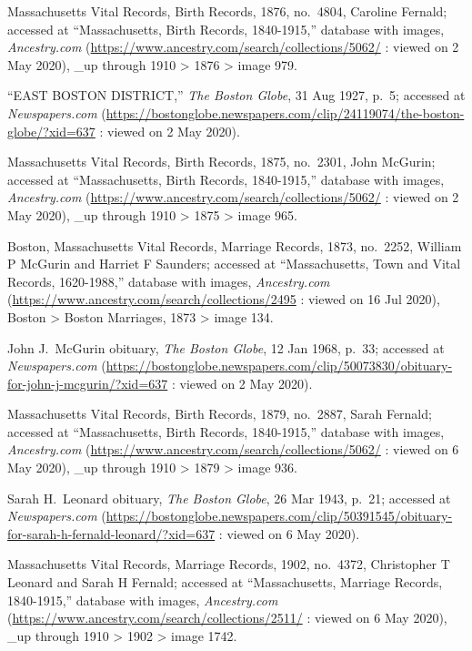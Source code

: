 \begin{thebibliography}{999}

Massachusetts Vital Records, Birth Records, 1876, no.\ 4804, Caroline Fernald; accessed at ``Massachusetts, Birth Records, 1840-1915,'' database with images, \textit{Ancestry.com} (\url{https://www.ancestry.com/search/collections/5062/} : viewed on 2 May 2020), \_up through 1910 > 1876 > image 979.

``EAST BOSTON DISTRICT,'' \textit{The Boston Globe}, 31 Aug 1927, p.\ 5; accessed at \textit{Newspapers.com} (\url{https://bostonglobe.newspapers.com/clip/24119074/the-boston-globe/?xid=637} : viewed on 2 May 2020).

Massachusetts Vital Records, Birth Records, 1875, no.\ 2301, John McGurin; accessed at ``Massachusetts, Birth Records, 1840-1915,'' database with images, \textit{Ancestry.com} (\url{https://www.ancestry.com/search/collections/5062/} : viewed on 2 May 2020), \_up through 1910 > 1875 > image 965.

Boston, Massachusetts Vital Records, Marriage Records, 1873, no.\ 2252, William P McGurin and Harriet F Saunders; accessed at ``Massachusetts, Town and Vital Records, 1620-1988,'' database with images, \textit{Ancestry.com} (\url{https://www.ancestry.com/search/collections/2495} : viewed on 16 Jul 2020), Boston > Boston Marriages, 1873 > image 134.

John J.\ McGurin obituary, \textit{The Boston Globe}, 12 Jan 1968, p.\ 33; accessed at \textit{Newspapers.com} (\url{https://bostonglobe.newspapers.com/clip/50073830/obituary-for-john-j-mcgurin/?xid=637} : viewed on 2 May 2020).


Massachusetts Vital Records, Birth Records, 1879, no.\ 2887, Sarah Fernald; accessed at ``Massachusetts, Birth Records, 1840-1915,'' database with images, \textit{Ancestry.com} (\url{https://www.ancestry.com/search/collections/5062/} : viewed on 6 May 2020), \_up through 1910 > 1879 > image 936.

Sarah H.\ Leonard obituary, \textit{The Boston Globe}, 26 Mar 1943, p.\ 21; accessed at \textit{Newspapers.com} (\url{https://bostonglobe.newspapers.com/clip/50391545/obituary-for-sarah-h-fernald-leonard/?xid=637} : viewed on 6 May 2020).

Massachusetts Vital Records, Marriage Records, 1902, no.\ 4372, Christopher T Leonard and Sarah H Fernald; accessed at ``Massachusetts, Marriage Records, 1840-1915,'' database with images, \textit{Ancestry.com} (\url{https://www.ancestry.com/search/collections/2511/} : viewed on 6 May 2020), \_up through 1910 > 1902 > image 1742.


\end{thebibliography}

